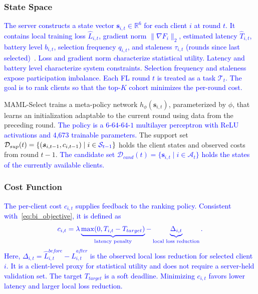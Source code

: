 \documentclass[journal]{IEEEtran}
\newcommand{\revision}[1]{\textcolor{blue}{#1}}
\begin{document}
\subsubsection{State Space}
\revision{The server constructs a state vector $\bm{s}_{i,t} \in \mathbb{R}^6$ for each client $i$ at round $t$. It contains local training loss $\hat{L}_{i,t}$, gradient norm $\|\nabla F_i\|_2$, estimated latency $\hat{T}_{i,t}$, battery level $b_{i,t}$, selection frequency $q_{i,t}$, and staleness $\tau_{i,t}$ (rounds since last selected)}~\cite{pan2024contextual,xu2024federated}. \revision{Loss and gradient norm characterize statistical utility. Latency and battery level characterize system constraints. Selection frequency and staleness expose participation imbalance. Each FL round $t$ is treated as a task $\mathcal{T}_t$. The goal is to rank clients so that the top-$K$ cohort minimizes the per-round cost.}

MAML-Select trains a meta-policy network $h_\phi(\bm{s}_{i,t})$, parameterized by $\phi$, that learns an initialization adaptable to the current round using data from the preceding round. \revision{The policy is a $6$-$64$-$64$-$1$ multilayer perceptron with ReLU activations and 4,673 trainable parameters.} The support set $\mathcal{D}_{sup}(t) = \{(\bm{s}_{i,t-1}, c_{i,t-1}) \mid i \in \revision{\mathcal{S}_{t-1}}\}$ holds the client states and observed costs from round $t-1$. \revision{The candidate set $\mathcal{D}_{cand}(t) = \{\bm{s}_{i,t} \mid i \in \mathcal{A}_t\}$ holds the states of the currently available clients.}

\subsubsection{Cost Function}
\revision{The per-client cost $c_{i,t}$ supplies feedback to the ranking policy. Consistent with~\eqref{eq:bi_objective}, it is defined as}
\begin{equation}
	\color{blue}
	c_{i,t} = \lambda \underbrace{\max(0, T_{i,t} - T_{target})}_{\text{latency penalty}} - \underbrace{\Delta_{i,t}}_{\text{local loss reduction}}.
	\label{eq:cost}
\end{equation}
\revision{Here, $\Delta_{i,t}=\hat{L}_{i,t}^{before}-\hat{L}_{i,t}^{after}$ is the observed local loss reduction for selected client $i$. It is a client-level proxy for statistical utility and does not require a server-held validation set. The target $T_{target}$ is a soft deadline. Minimizing $c_{i,t}$ favors lower latency and larger local loss reduction.}
\end{document}
